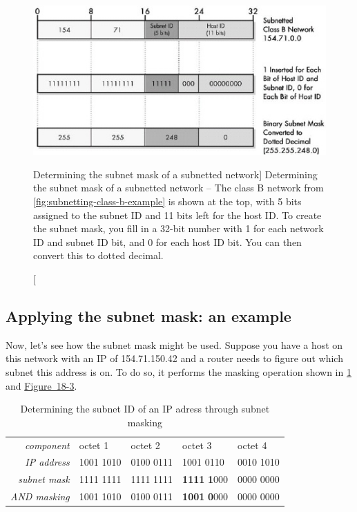 \begin{figure}
   \centering
   \includegraphics[width=.7\textwidth]{images/determining-subnet-mask.jpg}
   \caption
      [Determining the subnet mask of a subnetted network]
      {Determining the subnet mask of a subnetted network -- The class B network from \vref{fig:subnetting-class-b-example} is shown at the top,
      with 5 bits assigned to the subnet ID and 11 bits left for the host ID.
      To create the subnet mask, you fill in a 32-bit number with 1 for each network ID and subnet ID bit, and 0 for each host ID bit.
      You can then convert this to dotted decimal.}
   \label{fig:determining-subnet-mask}
\end{figure}



\subsection{Applying the subnet mask: an example}

Now, let's see how the subnet mask might be used. Suppose you have a
host on this network with an IP of 154.71.150.42 and a router needs to
figure out which subnet this address is on.
To do so, it performs the masking operation shown in \cref{tab:determining-prefix}
and
\protect\hyperlink{ch18s03.htmlux5cux23determining_the_subnet_id_of_an_ip-id001}{Figure~18-3}.

\begin{table}
   \centering
   \begin{tabular}{rllll}
   \textit{component}   & octet 1   & octet 2   & octet 3                     & octet 4   \\[1ex]
   \textit{IP address}  & 1001 1010 & 0100 0111 & 1001 0110                   & 0010 1010 \\
   \textit{subnet mask} & 1111 1111 & 1111 1111 & \textbf{1111} \textbf{1}000 & 0000 0000 \\
   \textit{AND masking} & 1001 1010 & 0100 0111 & \textbf{1001} \textbf{0}000 & 0000 0000 \\
   \end{tabular}
   \caption{Determining the subnet ID of an IP adress through subnet masking}
   \label{tab:determining-prefix}
\end{table}


